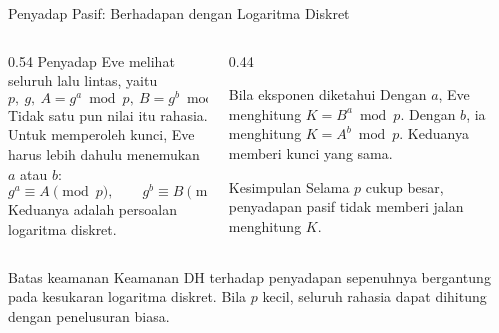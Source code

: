 \documentclass[aspectratio=169,11pt]{beamer}
\begin{document}
\begin{frame}{Penyadap Pasif: Berhadapan dengan Logaritma Diskret}
    \begin{columns}[T,onlytextwidth]
        \begin{column}{0.54\textwidth}
            \footnotesize
            Penyadap Eve melihat seluruh lalu lintas, yaitu
            \[
                p,\ g,\ A = g^{a} \bmod p,\ B = g^{b} \bmod p .
            \]
            Tidak satu pun nilai itu rahasia. Untuk memperoleh kunci, Eve
            harus lebih dahulu menemukan $a$ atau $b$:
            \[
                g^{a} \equiv A \pmod p, \qquad
                g^{b} \equiv B \pmod p .
            \]
            Keduanya adalah persoalan logaritma diskret.
        \end{column}
        \begin{column}{0.44\textwidth}
            \begin{block}{Bila eksponen diketahui}
                \footnotesize
                Dengan $a$, Eve menghitung $K = B^{a} \bmod p$. Dengan $b$,
                ia menghitung $K = A^{b} \bmod p$. Keduanya memberi kunci
                yang sama.
            \end{block}
            \begin{exampleblock}{Kesimpulan}
                \footnotesize
                Selama $p$ cukup besar, penyadapan pasif tidak memberi jalan
                menghitung $K$.
            \end{exampleblock}
        \end{column}
    \end{columns}
    \vspace{0.1cm}
    \begin{alertblock}{Batas keamanan}
        \footnotesize
        Keamanan DH terhadap penyadapan sepenuhnya bergantung pada
        kesukaran logaritma diskret. Bila $p$ kecil, seluruh rahasia dapat
        dihitung dengan penelusuran biasa.
    \end{alertblock}
\end{frame}
\end{document}
